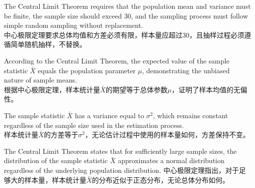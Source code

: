 \documentclass{article}
\begin{document}
\begin{choices}
    \item The Central Limit Theorem requires that the population mean and variance must be finite, the sample size should exceed 30, and the sampling process must follow simple random sampling without replacement.\\
    中心极限定理要求总体均值和方差必须有限，样本量应超过30，且抽样过程必须遵循简单随机抽样，不替换。
    \item According to the Central Limit Theorem, the expected value of the sample statistic \(\bar{X}\) equals the population parameter \(\mu\), demonstrating the unbiased nature of sample means.\\
    根据中心极限定理，样本统计量\(\bar{X}\)的期望等于总体参数\(\mu\)，证明了样本均值的无偏性。
    \item The sample statistic \(\bar{X}\) has a variance equal to \(\sigma^2\), which remains constant regardless of the sample size used in the estimation process.\\
    样本统计量\(\bar{X}\)的方差等于\(\sigma^2\)，无论估计过程中使用的样本量如何，方差保持不变。
    \item The Central Limit Theorem states that for sufficiently large sample sizes, the distribution of the sample statistic \(\bar{X}\) approximates a normal distribution regardless of the underlying population distribution.
    中心极限定理指出，对于足够大的样本量，样本统计量\(\bar{X}\)的分布近似于正态分布，无论总体分布如何。
\end{choices}
\end{document}
